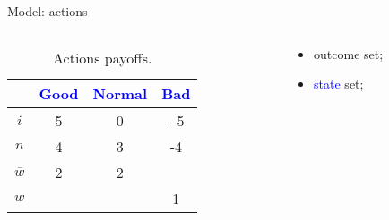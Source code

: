 \documentclass[usenames,dvipsnames,aspectratio=169,11pt, envcountsect, handout]{beamer}
\begin{document}
\begin{frame}[noframenumbering]{Model: actions}

	\begin{columns}
		\begin{column}{0.45\textwidth}  %
			\begin{center}
				\begin{table}[H]
					\centering
					\begin{tabular}{c | c c c}
						                   & \textcolor{blue}{Good} & \textcolor{blue}{Normal} & \textcolor{blue}{Bad} \\
						\hline
						\( i \)            & 5                      & 0                        & - 5                   \\
						\( n \)            & 4                      & 3                        & -4                    \\
						\( \overline{w} \) & 2                      & 2                        &                       \\
						\( w \)            &                        &                          & 1                     \\
					\end{tabular}
					\caption{Actions payoffs.}
					\label{tab:actions_inv}
				\end{table}
			\end{center}
		\end{column}

		\begin{column}{0.55\textwidth}  %
			\begin{itemize}
				\item outcome set;
				\item \textcolor{blue}{state} set;
			\end{itemize}
		\end{column}
	\end{columns}

\end{frame}
\end{document}
